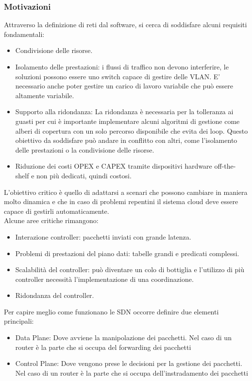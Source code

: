 \documentclass{article}
\begin{document}
		\subsubsection{Motivazioni}
		Attraverso la definizione di reti dal software, si cerca di soddisfare alcuni requisiti fondamentali:
		\begin{itemize}
		    \item Condivisione delle risorse.
		    \item Isolamento delle prestazioni: i flussi di traffico non devono interferire, le soluzioni possono essere uno switch capace di gestire delle VLAN. E' necessario anche poter gestire un carico di lavoro variabile che può essere altamente variabile. 
		    \item Supporto alla ridondanza: La ridondanza è necessaria per la tolleranza ai guasti per cui è importante implementare alcuni algoritmi di gestione come alberi di copertura con un solo percorso disponibile che evita dei loop. 
		    Questo obiettivo da soddisfare può andare in conflitto con altri, come l'isolamento delle prestazioni o la condivisione delle risorse.
		    \item Riduzione dei costi OPEX e CAPEX tramite dispositivi hardware off-the-shelf e non più dedicati, quindi costosi.
		\end{itemize}
		L'obiettivo critico è quello di adattarsi a scenari che possono cambiare in maniera molto dinamica e che in caso di problemi repentini il sistema cloud deve essere capace di gestirli automaticamente.\\
		Alcune aree critiche rimangono:
		\begin{itemize}
		    \item Interazione controller: pacchetti inviati con grande latenza.
		    \item Problemi di prestazioni del piano dati: tabelle grandi e predicati complessi.
		    \item Scalabilità del controller: può diventare un colo di bottiglia e l'utilizzo di più controller necessità l'implementazione di una coordinazione.
		    \item Ridondanza del controller.
		\end{itemize}
		Per capire meglio come funzionano le SDN occorre definire due elementi principali:
		\begin{itemize}
		\item Data Plane: Dove avviene la manipolazione dei pacchetti. Nel caso di un router è la parte che si occupa del forwarding dei pacchetti
		\item Control Plane: Dove vengono prese le decisioni per la gestione dei pacchetti. Nel caso di un router è la parte che si occupa dell'instradamento dei pacchetti
		\end{itemize}
\end{document}
